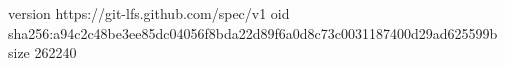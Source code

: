 version https://git-lfs.github.com/spec/v1
oid sha256:a94c2c48be3ee85dc04056f8bda22d89f6a0d8c73c0031187400d29ad625599b
size 262240
